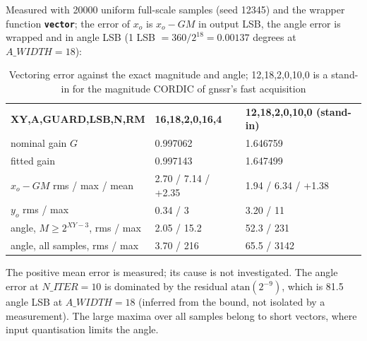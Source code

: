 \documentclass[a4paper, 12pt, notitlepage]{report}
\newcommand{\signal}[1]{{\textbf{\tt#1}}}
\begin{document}
Measured with 20000 uniform full-scale samples (seed 12345) and the wrapper function \signal{vector};
the error of $x_o$ is $x_o - G M$ in output LSB, the angle error is wrapped and in angle LSB
(1 LSB $= 360 / 2^{18} = 0.00137$ degrees at $A\_WIDTH = 18$):
\begin{table}[htbp]
   \center\small
   \begin{tabular}{@{}lll@{}}
      \rowcolor{tableheadcolor}\textbf{XY,A,GUARD,LSB,N,RM} & \textbf{16,18,2,0,16,4} & \textbf{12,18,2,0,10,0 (stand-in)} \\
      nominal gain $G$ & 0.997062 & 1.646759 \\\midrule
      fitted gain & 0.997143 & 1.647499 \\\midrule
      $x_o - GM$ rms / max / mean & 2.70 / 7.14 / +2.35 & 1.94 / 6.34 / +1.38 \\\midrule
      $y_o$ rms / max & 0.34 / 3 & 3.20 / 11 \\\midrule
      angle, $M \ge 2^{XY-3}$, rms / max & 2.05 / 15.2 & 52.3 / 231 \\\midrule
      angle, all samples, rms / max & 3.70 / 216 & 65.5 / 3142 \\
      \bottomrule
   \end{tabular}
   \caption{Vectoring error against the exact magnitude and angle; 12,18,2,0,10,0 is a stand-in for the magnitude CORDIC of gnssr's fast acquisition}
   \label{tab:pipe_vec_acc}
\end{table}
The positive mean error is measured; its cause is not investigated. The angle error at $N\_ITER = 10$ is
dominated by the residual $\mathrm{atan}(2^{-9})$, which is 81.5 angle LSB at $A\_WIDTH = 18$ (inferred from the
bound, not isolated by a measurement). The large maxima over all samples belong to short vectors, where input
quantisation limits the angle.
\end{document}
